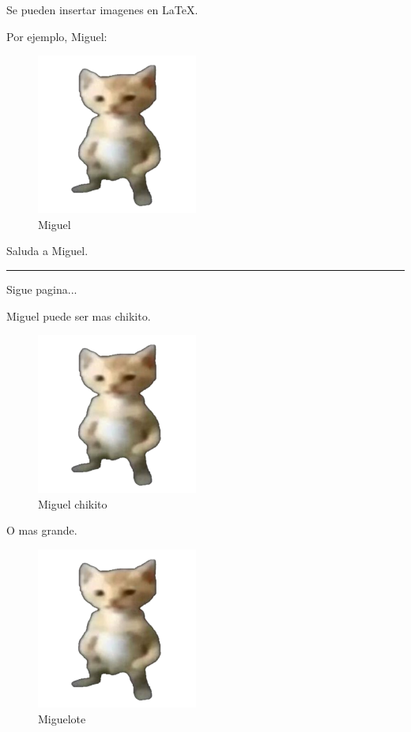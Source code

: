 \documentclass[12pt]{article}
\begin{document}
    Se pueden insertar imagenes en \LaTeX.

    Por ejemplo, Miguel:

    \begin{figure}[h]
        \centering %

        \includegraphics{miguel.png}

        \caption{Miguel} %
    \end{figure}

    Saluda a Miguel.

    \rule{5cm}{0.4pt}

    Sigue pagina...

    \newpage


    Miguel puede ser mas chikito.

    \begin{figure}[h]
        \centering

        \includegraphics[scale=0.2]{miguel.png}

        \caption{Miguel chikito}
    \end{figure}


    O mas grande.

    \begin{figure}[h]
        \centering

        \includegraphics[scale=2]{miguel.png}

        \caption{Miguelote}
    \end{figure}
\end{document}
